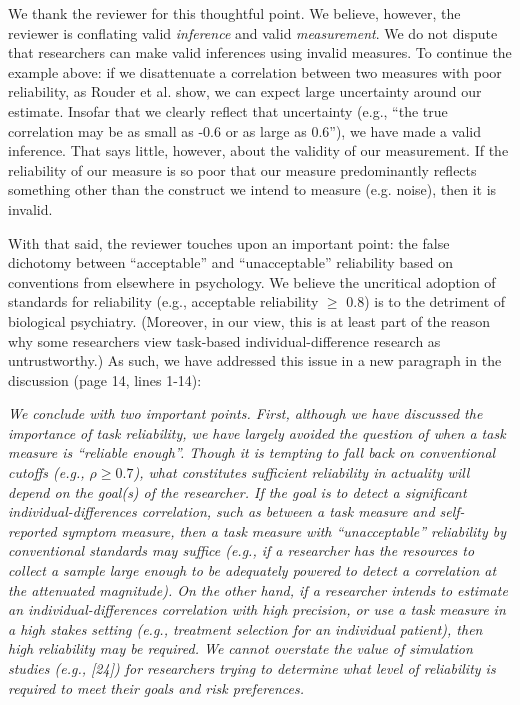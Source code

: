 \documentclass[a4paper,12pt]{article}
\begin{document}
We thank the reviewer for this thoughtful point. We believe, however, the reviewer is conflating valid \textit{inference} and valid \textit{measurement}. We do not dispute that researchers can make valid inferences using invalid measures. To continue the example above: if we disattenuate a correlation between two measures with poor reliability, as Rouder et al. \cite{rouder2019most} show, we can expect large uncertainty around our estimate. Insofar that we clearly reflect that uncertainty (e.g., ``the true correlation may be as small as -0.6 or as large as 0.6''), we have made a valid inference. That says little, however, about the validity of our measurement. If the reliability of our measure is so poor that our measure predominantly reflects something other than the construct we intend to measure (e.g. noise), then it is invalid. 

With that said, the reviewer touches upon an important point: the false dichotomy between ``acceptable'' and ``unacceptable'' reliability based on conventions from elsewhere in psychology. We believe the uncritical adoption of standards for reliability (e.g., acceptable reliability $\geq$ 0.8) is to the detriment of biological psychiatry. (Moreover, in our view, this is at least part of the reason why some researchers view task-based individual-difference research as untrustworthy.) As such, we have addressed this issue in a new paragraph in the discussion (page 14, lines 1-14):

\begin{displayquote}
    \textit{We conclude with two important points. First, although we have discussed the importance of task reliability, we have largely avoided the question of when a task measure is ``reliable enough''. Though it is tempting to fall back on conventional cutoffs (e.g., $\rho \geq 0.7$), what constitutes sufficient reliability in actuality will depend on the goal(s) of the researcher. If the goal is to detect a significant individual-differences correlation, such as between a task measure and self-reported symptom measure, then a task measure with ``unacceptable'' reliability by conventional standards may suffice (e.g., if a researcher has the resources to collect a sample large enough to be adequately powered to detect a correlation at the attenuated magnitude). On the other hand, if a researcher intends to estimate an individual-differences correlation with high precision, or use a task measure in a high stakes setting (e.g., treatment selection for an individual patient), then high reliability may be required. We cannot overstate the value of simulation studies (e.g., [24]) for researchers trying to determine what level of reliability is required to meet their goals and risk preferences.}
\end{displayquote}
\end{document}
